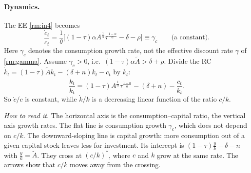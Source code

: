 \paragraph{Dynamics.} The EE \eqref{rm:in4} becomes
\[
\frac{\dot c_t}{c_t}=\frac1\theta\Big[(1-\tau)\alpha A^{\frac1\alpha}\tau^{\frac{1-\alpha}{\alpha}}-\delta-\rho\Big]\equiv\gamma_c\qquad\text{(a constant)}.
\]
Here $\gamma_c$ denotes the consumption growth rate, not the effective discount rate $\gamma$ of \eqref{rm:gamma}. Assume $\gamma_c>0$, i.e.\ $(1-\tau)\alpha\tilde A>\delta+\rho$. Divide the RC $\dot k_t=(1-\tau)\tilde Ak_t-(\delta+n)k_t-c_t$ by $k_t$:
\[
\frac{\dot k_t}{k_t}=(1-\tau)A^{\frac1\alpha}\tau^{\frac{1-\alpha}{\alpha}}-(\delta+n)-\frac{c_t}{k_t}.
\]
So $\dot c/c$ is constant, while $\dot k/k$ is a decreasing linear function of the ratio $c/k$.

\begin{center}
\end{center}
\emph{How to read it.} The horizontal axis is the consumption--capital ratio, the vertical axis growth rates. The flat line is consumption growth $\gamma_c$, which does not depend on $c/k$. The downward-sloping line is capital growth: more consumption out of a given capital stock leaves less for investment. Its intercept is $(1-\tau)\frac yk-\delta-n$ with $\frac yk=\tilde A$. They cross at $(c/k)^*$, where $c$ and $k$ grow at the same rate. The arrows show that $c/k$ moves away from the crossing.

